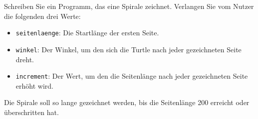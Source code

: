 \begin{myexercise}
	Schreiben Sie ein Programm, das eine Spirale zeichnet. Verlangen Sie vom Nutzer die folgenden drei Werte:
	\begin{itemize}
		\item \lstinline|seitenlaenge|: Die Startlänge der ersten Seite.
		\item \lstinline|winkel|: Der Winkel, um den sich die Turtle nach jeder gezeichneten Seite dreht.
		\item \lstinline|increment|: Der Wert, um den die Seitenlänge nach jeder gezeichneten Seite erhöht wird.
	\end{itemize}
	Die Spirale soll so lange gezeichnet werden, bis die Seitenlänge 200 erreicht oder überschritten hat.

	\begin{myanswer}
		
	\end{myanswer}
\end{myexercise}





% 		


